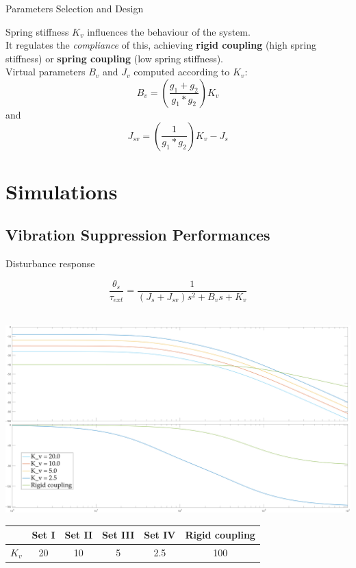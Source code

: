 \documentclass[10pt]{beamer}
\begin{document}
\begin{frame}{Parameters Selection and Design}
	
Spring stiffness $ K_{v} $ influences the behaviour of the system.\\
\bigskip
It regulates the \textit{compliance} of this, achieving \textbf{rigid coupling} (high spring stiffness) or \textbf{spring coupling} (low spring stiffness).\\
\bigskip
Virtual parameters $ B_{v} $ and $J_{v} $ computed according to $ K_{v} $:
\begin{equation*}
	B_v = \left(\frac{g_1 + g_2}{g_1*g_2}\right) K_v
\end{equation*}
and
\begin{equation*}
	J_{sv} = \left(\frac{1}{g_1*g_2}\right) K_v - J_s
\end{equation*}

\end{frame}	



\section{Simulations}

\subsection*{Vibration Suppression Performances}
\begin{frame}{Disturbance response}
	
  \begin{equation*}
    \dfrac{\theta_s}{\tau_{ext}} = \dfrac{1}{(J_s + J_{sv}) s^2 + B_v s + K_v}
  \end{equation*}\\
  \begin{center}
    \includegraphics[width=\textwidth, height=0.45\textwidth]{../reportTeleop/Images/bodo}\\
    \bigskip
    \begin{tabular}{c|c c c c c}
       & Set I & Set II & Set III & Set IV & Rigid coupling \\
      \midrule 
	    $K_{v}$ & 20 & 10 & 5 & 2.5 & 100 \\
    \end{tabular}
  \end{center}

\end{frame}
\end{document}
